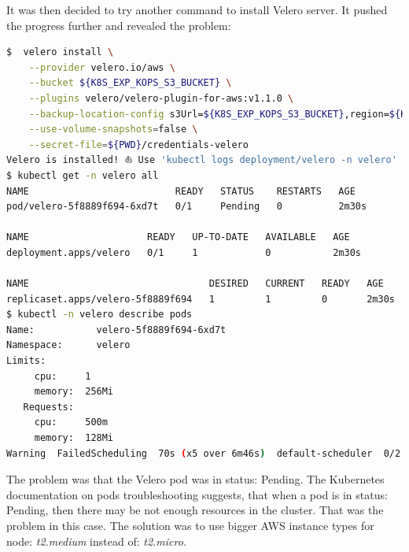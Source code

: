 It was then decided to try another command to install Velero server. It pushed the progress further and revealed the problem:
\begin{lstlisting}[basicstyle=\tiny,caption={Another attempt to deploy Velero server},captionpos=b,language=Bash,xleftmargin=1cm]
$  velero install \
    --provider velero.io/aws \
    --bucket ${K8S_EXP_KOPS_S3_BUCKET} \
    --plugins velero/velero-plugin-for-aws:v1.1.0 \
    --backup-location-config s3Url=${K8S_EXP_KOPS_S3_BUCKET},region=${K8S_EXP_REGION} \
    --use-volume-snapshots=false \
    --secret-file=${PWD}/credentials-velero
Velero is installed! ⛵ Use 'kubectl logs deployment/velero -n velero' to view the status.
$ kubectl get -n velero all
NAME                          READY   STATUS    RESTARTS   AGE
pod/velero-5f8889f694-6xd7t   0/1     Pending   0          2m30s

NAME                     READY   UP-TO-DATE   AVAILABLE   AGE
deployment.apps/velero   0/1     1            0           2m30s

NAME                                DESIRED   CURRENT   READY   AGE
replicaset.apps/velero-5f8889f694   1         1         0       2m30s
$ kubectl -n velero describe pods
Name:           velero-5f8889f694-6xd7t
Namespace:      velero
Limits:
     cpu:     1
     memory:  256Mi
   Requests:
     cpu:     500m
     memory:  128Mi
Warning  FailedScheduling  70s (x5 over 6m46s)  default-scheduler  0/2 nodes are available: 2 Insufficient cpu.
\end{lstlisting}

The problem was that the Velero pod was in status: Pending. The Kubernetes documentation on pods troubleshooting suggests, that when a pod is in status: Pending, then there may be not enough resources in the cluster\cite{k8s-deb}. That was the problem in this case. The solution was to use bigger AWS instance types for node: \textit{t2.medium} instead of: \textit{t2.micro}.

